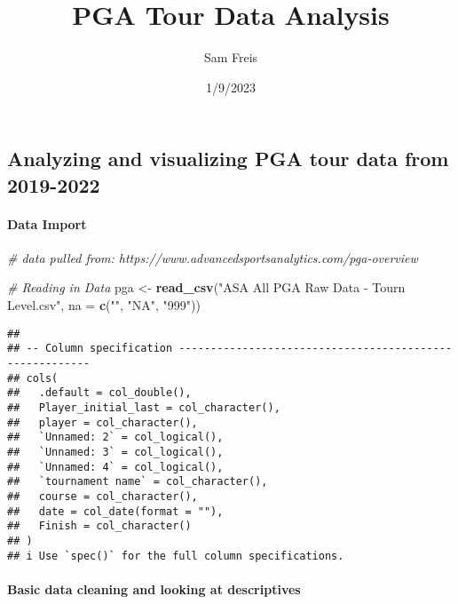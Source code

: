 \documentclass[
]{article}
\title{PGA Tour Data Analysis}
\author{Sam Freis}
\date{1/9/2023}
\newenvironment{Shaded}{\begin{snugshade}}{\end{snugshade}}
\newcommand{\CommentTok}[1]{\textcolor[rgb]{0.56,0.35,0.01}{\textit{#1}}}
\newcommand{\DataTypeTok}[1]{\textcolor[rgb]{0.13,0.29,0.53}{#1}}
\newcommand{\KeywordTok}[1]{\textcolor[rgb]{0.13,0.29,0.53}{\textbf{#1}}}
\newcommand{\NormalTok}[1]{#1}
\newcommand{\StringTok}[1]{\textcolor[rgb]{0.31,0.60,0.02}{#1}}
\begin{document}
\maketitle

\hypertarget{analyzing-and-visualizing-pga-tour-data-from-2019-2022}{%
\subsection{Analyzing and visualizing PGA tour data from
2019-2022}\label{analyzing-and-visualizing-pga-tour-data-from-2019-2022}}

\hypertarget{data-import}{%
\paragraph{Data Import}\label{data-import}}

\begin{Shaded}
\begin{Highlighting}[]
\CommentTok{# data pulled from: https://www.advancedsportsanalytics.com/pga-overview}

\CommentTok{# Reading in Data}
\NormalTok{pga <-}\StringTok{ }\KeywordTok{read_csv}\NormalTok{(}\StringTok{"ASA All PGA Raw Data - Tourn Level.csv"}\NormalTok{, }\DataTypeTok{na =} \KeywordTok{c}\NormalTok{(}\StringTok{""}\NormalTok{, }\StringTok{"NA"}\NormalTok{, }\StringTok{"999"}\NormalTok{))}
\end{Highlighting}
\end{Shaded}

\begin{verbatim}
## 
## -- Column specification --------------------------------------------------------
## cols(
##   .default = col_double(),
##   Player_initial_last = col_character(),
##   player = col_character(),
##   `Unnamed: 2` = col_logical(),
##   `Unnamed: 3` = col_logical(),
##   `Unnamed: 4` = col_logical(),
##   `tournament name` = col_character(),
##   course = col_character(),
##   date = col_date(format = ""),
##   Finish = col_character()
## )
## i Use `spec()` for the full column specifications.
\end{verbatim}

\hypertarget{basic-data-cleaning-and-looking-at-descriptives}{%
\paragraph{Basic data cleaning and looking at
descriptives}\label{basic-data-cleaning-and-looking-at-descriptives}}
\end{document}
